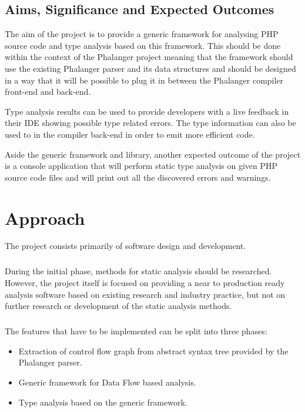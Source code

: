 \section{Aims, Significance and Expected Outcomes}

The aim of the project is to provide a generic framework 
for analysing PHP source code and type analysis based on 
this framework. This should be done within the context 
of the Phalanger project \cite{benda2006phalanger} meaning 
that the framework should use the existing Phalanger parser 
and its data structures and should be designed in a way that 
it will be possible to plug it in between the Phalanger 
compiler front-end and back-end.

Type analysis results can be used to provide developers with 
a live feedback in their IDE showing possible type related 
errors. The type information can also be used to in the compiler 
back-end in order to emit more efficient code.

Aside the generic framework and library, another expected 
outcome of the project is a console application that will perform 
static type analysis on given PHP source code files and 
will print out all the discovered errors and warnings.

\chapter{Approach}

The project consists primarily of software design and development. 

\paragraph*{}
During the initial phase, methods for static analysis should be 
researched. However, the project itself is focused on providing 
a near to production ready analysis software based on existing 
research and industry practice, but not on further research 
or development of the static analysis methods.

\paragraph*{}
The features that have to be implemented can 
be split into three phases:
\begin{itemize}
    \item Extraction of control flow graph from abstract syntax tree provided by the Phalanger parser.
    \item Generic framework for Data Flow based analysis.
    \item Type analysis based on the generic framework.
\end{itemize}

